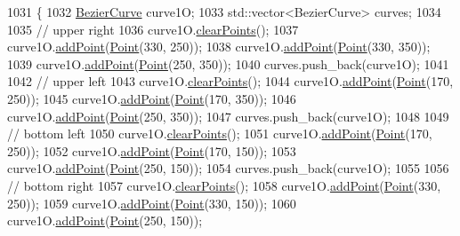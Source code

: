 \begin{DoxyCode}
1031                \{
1032     \mbox{\hyperlink{class_bezier_curve}{BezierCurve}} curve1O;
1033     std::vector<BezierCurve> curves;
1034 
1035     \textcolor{comment}{// upper right}
1036     curve1O.\mbox{\hyperlink{class_bezier_curve_a0ba8ce66d5af5971ae6a1b506029728e}{clearPoints}}();
1037     curve1O.\mbox{\hyperlink{class_bezier_curve_a38d16c18b36ae45619b05e26e226cf34}{addPoint}}(\mbox{\hyperlink{class_point}{Point}}(330, 250));
1038     curve1O.\mbox{\hyperlink{class_bezier_curve_a38d16c18b36ae45619b05e26e226cf34}{addPoint}}(\mbox{\hyperlink{class_point}{Point}}(330, 350));
1039     curve1O.\mbox{\hyperlink{class_bezier_curve_a38d16c18b36ae45619b05e26e226cf34}{addPoint}}(\mbox{\hyperlink{class_point}{Point}}(250, 350));
1040     curves.push\_back(curve1O);
1041 
1042     \textcolor{comment}{// upper left}
1043     curve1O.\mbox{\hyperlink{class_bezier_curve_a0ba8ce66d5af5971ae6a1b506029728e}{clearPoints}}();
1044     curve1O.\mbox{\hyperlink{class_bezier_curve_a38d16c18b36ae45619b05e26e226cf34}{addPoint}}(\mbox{\hyperlink{class_point}{Point}}(170, 250));
1045     curve1O.\mbox{\hyperlink{class_bezier_curve_a38d16c18b36ae45619b05e26e226cf34}{addPoint}}(\mbox{\hyperlink{class_point}{Point}}(170, 350));
1046     curve1O.\mbox{\hyperlink{class_bezier_curve_a38d16c18b36ae45619b05e26e226cf34}{addPoint}}(\mbox{\hyperlink{class_point}{Point}}(250, 350));
1047     curves.push\_back(curve1O);
1048 
1049     \textcolor{comment}{// bottom left}
1050     curve1O.\mbox{\hyperlink{class_bezier_curve_a0ba8ce66d5af5971ae6a1b506029728e}{clearPoints}}();
1051     curve1O.\mbox{\hyperlink{class_bezier_curve_a38d16c18b36ae45619b05e26e226cf34}{addPoint}}(\mbox{\hyperlink{class_point}{Point}}(170, 250));
1052     curve1O.\mbox{\hyperlink{class_bezier_curve_a38d16c18b36ae45619b05e26e226cf34}{addPoint}}(\mbox{\hyperlink{class_point}{Point}}(170, 150));
1053     curve1O.\mbox{\hyperlink{class_bezier_curve_a38d16c18b36ae45619b05e26e226cf34}{addPoint}}(\mbox{\hyperlink{class_point}{Point}}(250, 150));
1054     curves.push\_back(curve1O);
1055 
1056     \textcolor{comment}{// bottom right}
1057     curve1O.\mbox{\hyperlink{class_bezier_curve_a0ba8ce66d5af5971ae6a1b506029728e}{clearPoints}}();
1058     curve1O.\mbox{\hyperlink{class_bezier_curve_a38d16c18b36ae45619b05e26e226cf34}{addPoint}}(\mbox{\hyperlink{class_point}{Point}}(330, 250));
1059     curve1O.\mbox{\hyperlink{class_bezier_curve_a38d16c18b36ae45619b05e26e226cf34}{addPoint}}(\mbox{\hyperlink{class_point}{Point}}(330, 150));
1060     curve1O.\mbox{\hyperlink{class_bezier_curve_a38d16c18b36ae45619b05e26e226cf34}{addPoint}}(\mbox{\hyperlink{class_point}{Point}}(250, 150));

\end{DoxyCode}
